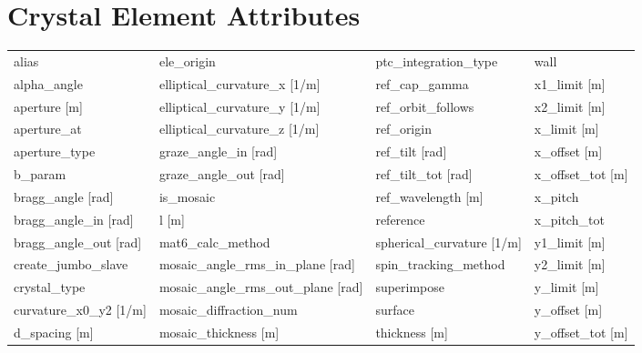  \vfill
 
 \section{Crystal Element Attributes}
 \label{s:list.crystal}
 
 \begin{tabular}{llll} \toprule
alias                            & ele_origin                       & ptc_integration_type             & wall                             \\
alpha_angle                      & elliptical_curvature_x [1/m]     & ref_cap_gamma                    & x1_limit [m]                     \\
aperture [m]                     & elliptical_curvature_y [1/m]     & ref_orbit_follows                & x2_limit [m]                     \\
aperture_at                      & elliptical_curvature_z [1/m]     & ref_origin                       & x_limit [m]                      \\
aperture_type                    & graze_angle_in [rad]             & ref_tilt [rad]                   & x_offset [m]                     \\
b_param                          & graze_angle_out [rad]            & ref_tilt_tot [rad]               & x_offset_tot [m]                 \\
bragg_angle [rad]                & is_mosaic                        & ref_wavelength [m]               & x_pitch                          \\
bragg_angle_in [rad]             & l [m]                            & reference                        & x_pitch_tot                      \\
bragg_angle_out [rad]            & mat6_calc_method                 & spherical_curvature [1/m]        & y1_limit [m]                     \\
create_jumbo_slave               & mosaic_angle_rms_in_plane [rad]  & spin_tracking_method             & y2_limit [m]                     \\
crystal_type                     & mosaic_angle_rms_out_plane [rad] & superimpose                      & y_limit [m]                      \\
curvature_x0_y2 [1/m]            & mosaic_diffraction_num           & surface                          & y_offset [m]                     \\
d_spacing [m]                    & mosaic_thickness [m]             & thickness [m]                    & y_offset_tot [m]                 \\

\end{tabular}
